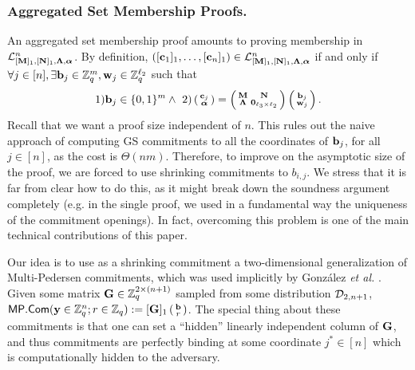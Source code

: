 \subsubsection{Aggregated Set Membership Proofs.} An aggregated set membership proof amounts to proving membership in $\mathcal{L}_{[\mathbf{{M}}]_1,[\mathbf{{N}}]_1,\mathbf{{\Lambda}},{\boldsymbol \alpha}}^n$. By definition, $([\mathbf{c}_1]_1,\ldots, [\mathbf{c}_n]_1) \in\mathcal{L}_{[\mathbf{{M}}]_1,[\mathbf{{N}}]_1,\mathbf{{\Lambda}},{\boldsymbol \alpha}}^n$ if and only if  $\forall j \in [n], \exists \mathbf{b}_j\in \mathbb{Z}_q^{m},\mathbf{w}_j\in\mathbb{Z}_q^{\ell_2}$ such that
$$
 1) \mathbf{b}_j\in \{0,1\}^{m}
  \wedge \ 2)
\left(\begin{smallmatrix}
    \mathbf{c}_j\\
    {\boldsymbol \alpha}
\end{smallmatrix}\right)
=
\left(\begin{smallmatrix}
    \mathbf{{M}}       & \mathbf{{N}}\\
    \mathbf{{\Lambda}} & \mathbf{{0}}_{{\ell_3}\times {\ell_2}}
\end{smallmatrix}\right)
\left(\begin{smallmatrix}
    \mathbf{b}_j\\
    \mathbf{w}_j
\end{smallmatrix}\right).
$$
Recall that we want a proof size independent of $n$. This rules out the naive approach of computing GS commitments to all the coordinates of $\mathbf{b}_j$, for all $j \in [n]$, as the cost is $\Theta(nm)$. Therefore, to improve on the asymptotic size of the proof, we are forced to use shrinking commitments to $b_{i,j}$. We stress that it is far from clear how to do this, as it might break down the soundness argument completely (e.g. in the single proof, we used in a fundamental way the uniqueness of the commitment openings). In fact, overcoming this problem is one of the main technical contributions of this paper. 

Our idea is to use as a shrinking commitment a two-dimensional generalization of Multi-Pedersen commitments, which was used implicitly by Gonz\'alez \textit{et al.} \cite{AC:GonHevRaf15}. Given some matrix $\mathbf{{G}} \in \mathbb{Z}_q^{2 \times (n+1)}$ sampled from some distribution $\mathcal{D}_{2,n+1}$, $\mathsf{MP}.\mathsf{Com}(\mathbf{y} \in \mathbb{Z}_q^{n}; r \in \mathbb{Z}_q):=[\mathbf{{G}}]_1 \left(\begin{smallmatrix}\mathbf{b} \\ r\end{smallmatrix}\right)$. The special thing about these commitments is that one can set a ``hidden'' linearly independent column of 
$\mathbf{{G}}$, and thus commitments are perfectly binding at some coordinate $j^*\in[n]$ which is computationally hidden to the adversary.

